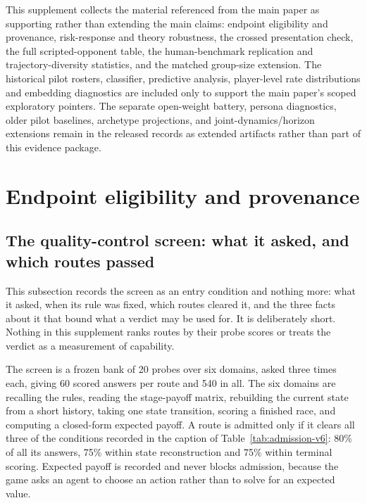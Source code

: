 \documentclass{article}
\begin{document}
\begin{sloppypar}
\noindent
This supplement collects the material referenced from the main paper as
supporting rather than extending the main claims: endpoint eligibility and
provenance, risk-response and theory robustness, the crossed presentation
check, the full scripted-opponent table, the human-benchmark replication and
trajectory-diversity statistics, and the matched group-size extension. The
historical pilot rosters, classifier, predictive analysis, player-level rate
distributions and embedding diagnostics are included only to support the main
paper's scoped exploratory pointers. The separate open-weight battery, persona
diagnostics, older pilot baselines, archetype projections, and
joint-dynamics/horizon extensions remain in the released records as extended
artifacts rather than part of this evidence package.
\end{sloppypar}

\section{Endpoint eligibility and provenance}

\subsection{The quality-control screen: what it asked, and which routes passed}
\label{app:admission-v6}

This subsection records the screen as an entry condition and nothing more: what
it asked, when its rule was fixed, which routes cleared it, and the three facts
about it that bound what a verdict may be used for. It is deliberately short.
Nothing in this supplement ranks routes by their probe scores or treats the
verdict as a measurement of capability.

The screen is a frozen bank of 20 probes over six domains, asked three times
each, giving 60 scored answers per route and 540 in all. The six domains are
recalling the rules, reading the stage-payoff matrix, rebuilding the current
state from a short history, taking one state transition, scoring a finished
race, and computing a closed-form expected payoff. A route is admitted only if
it clears all three of the conditions recorded in the caption of
Table~\ref{tab:admission-v6}: 80\% of all its answers, 75\% within state
reconstruction and 75\% within terminal scoring. Expected payoff is recorded
and never blocks admission, because the game asks an agent to choose an action
rather than to solve for an expected value.
\end{document}
